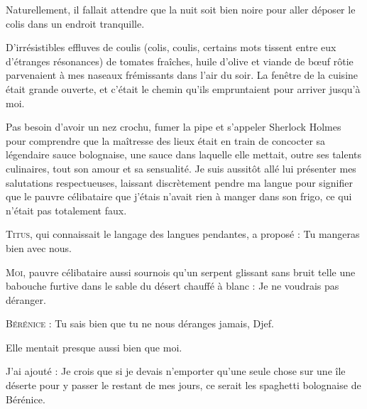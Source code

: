Naturellement, il fallait attendre que la nuit soit bien noire pour aller déposer le colis dans un endroit tranquille.

D’irrésistibles effluves de coulis (colis, coulis, certains mots tissent entre eux d’étranges résonances) de tomates fraîches, huile d’olive et viande de bœuf rôtie parvenaient à mes naseaux frémissants dans l’air du soir. La fenêtre de la cuisine était grande ouverte, et c’était le chemin qu’ils empruntaient pour arriver jusqu’à moi. 

\illusloflabel{}%
%
%
Pas besoin d’avoir un nez crochu, fumer la pipe et s’appeler Sherlock Holmes pour comprendre que la maîtresse des lieux était en train de concocter sa légendaire sauce bolognaise, une sauce dans laquelle elle mettait, outre ses talents culinaires, tout son amour et sa sensualité. Je suis aussitôt allé lui présenter mes salutations respectueuses, laissant discrètement pendre ma langue pour signifier que le pauvre célibataire que j’étais n’avait rien à manger dans son frigo, ce qui n’était pas totalement faux.

\begin{dialogue}

\textsc{Titus}, qui connaissait le langage des langues pendantes, a proposé : Tu mangeras bien avec nous.

\textsc{Moi}, pauvre célibataire aussi sournois qu’un serpent glissant sans bruit telle une babouche furtive dans le sable du désert chauffé à blanc : Je ne voudrais pas déranger.

\textsc{Bérénice} : Tu sais bien que tu ne nous déranges jamais, Djef.

\end{dialogue}

  Elle mentait presque aussi bien que moi.

J’ai ajouté : Je crois que si je devais n’emporter qu’une seule chose sur une île déserte pour y passer le restant de mes jours, ce serait les spaghetti bolognaise de Bérénice.


